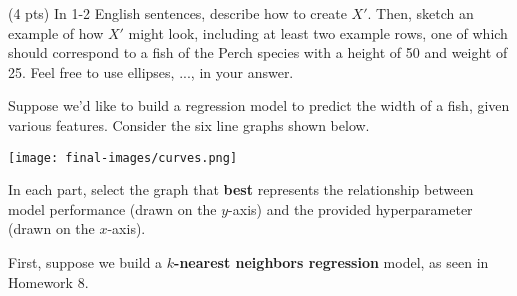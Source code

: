 \documentclass[twoside,12pt]{article}
\begin{document}
\begin{probset}
\begin{prob}[(14 pts)]
\begin{subprobset}
\begin{subprob}
\inlineresponsebox[2in]{}

\end{subprob}

\vspace{0.2in}

\begin{subprob}(4 pts) In 1-2 English sentences, describe how to create $X'$. Then, sketch an example of how $X'$ might look, including at least two example rows, one of which should correspond to a fish of the Perch species with a height of 50 and weight of 25. Feel free to use ellipses, ..., in your answer.

\begin{responsebox}{5.5in}

\end{responsebox}
    
\end{subprob}

\end{subprobset}

\end{prob}

\newpage

\begin{prob}[(14 pts)]

Suppose we'd like to build a regression model to predict the width of a fish, given various features. Consider the six line graphs shown below.

\begin{center}

\texttt{[image: final-images/curves.png]}
    
\end{center}


In each part, select the graph that \textbf{best} represents the relationship between model performance (drawn on the $y$-axis) and the provided hyperparameter (drawn on the $x$-axis).


First, suppose we build a \textbf{$k$-nearest neighbors regression} model, as seen in Homework 8.

\begin{subprobset}


\end{subprobset}
\end{prob}
\end{probset}
\end{document}
